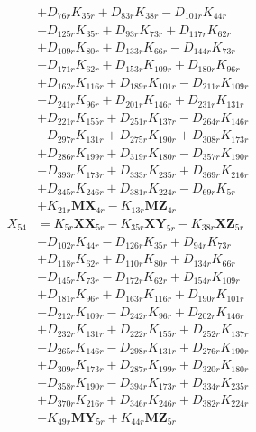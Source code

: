 \begin{multicols}{2}
\begin{align}
&+ D_{76r}K_{35r} + D_{83r}K_{38r} - D_{101r}K_{44r}  \nonumber \\
&- D_{125r}K_{35r} + D_{93r}K_{73r} + D_{117r}K_{62r}  \nonumber \\
&+ D_{109r}K_{80r} + D_{133r}K_{66r} - D_{144r}K_{73r}  \nonumber \\
&- D_{171r}K_{62r} + D_{153r}K_{109r} + D_{180r}K_{96r}  \nonumber \\
&+ D_{162r}K_{116r} + D_{189r}K_{101r} - D_{211r}K_{109r}  \nonumber \\
&- D_{241r}K_{96r} + D_{201r}K_{146r} + D_{231r}K_{131r}  \nonumber \\
&+ D_{221r}K_{155r} + D_{251r}K_{137r} - D_{264r}K_{146r}  \nonumber \\
&- D_{297r}K_{131r} + D_{275r}K_{190r} + D_{308r}K_{173r}  \nonumber \\
&+ D_{286r}K_{199r} + D_{319r}K_{180r} - D_{357r}K_{190r}  \nonumber \\
&- D_{393r}K_{173r} + D_{333r}K_{235r} + D_{369r}K_{216r}  \nonumber \\
&+ D_{345r}K_{246r} + D_{381r}K_{224r} - D_{69r}K_{5r}  \nonumber \\
&+ K_{21r}\mathbf{MX}_{4r} - K_{13r}\mathbf{MZ}_{4r} \nonumber \\
X_{54} &= K_{5r}\mathbf{XX}_{5r} - K_{35r}\mathbf{XY}_{5r} - K_{38r}\mathbf{XZ}_{5r}  \nonumber \\
&- D_{102r}K_{44r} - D_{126r}K_{35r} + D_{94r}K_{73r}  \nonumber \\
&+ D_{118r}K_{62r} + D_{110r}K_{80r} + D_{134r}K_{66r}  \nonumber \\
&- D_{145r}K_{73r} - D_{172r}K_{62r} + D_{154r}K_{109r}  \nonumber \\
&+ D_{181r}K_{96r} + D_{163r}K_{116r} + D_{190r}K_{101r}  \nonumber \\
&- D_{212r}K_{109r} - D_{242r}K_{96r} + D_{202r}K_{146r}  \nonumber \\
&+ D_{232r}K_{131r} + D_{222r}K_{155r} + D_{252r}K_{137r}  \nonumber \\
&- D_{265r}K_{146r} - D_{298r}K_{131r} + D_{276r}K_{190r}  \nonumber \\
&+ D_{309r}K_{173r} + D_{287r}K_{199r} + D_{320r}K_{180r}  \nonumber \\
&- D_{358r}K_{190r} - D_{394r}K_{173r} + D_{334r}K_{235r}  \nonumber \\
&+ D_{370r}K_{216r} + D_{346r}K_{246r} + D_{382r}K_{224r}  \nonumber \\
&- K_{49r}\mathbf{MY}_{5r} + K_{44r}\mathbf{MZ}_{5r} \nonumber \\

\end{align}
\end{multicols}
